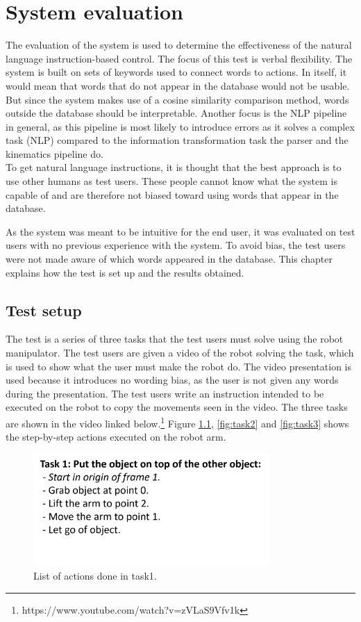 \chapter{System evaluation} \label{ch:eval}
The evaluation of the system is used to determine the effectiveness of the natural language instruction-based control. The focus of this test is verbal flexibility. The system is built on sets of keywords used to connect words to actions. In itself, it would mean that words that do not appear in the database would not be usable. But since the system makes use of a cosine similarity comparison method, words outside the database should be interpretable. Another focus is the NLP pipeline in general, as this pipeline is most likely to introduce errors as it solves a complex task (NLP) compared to the information transformation task the parser and the kinematics pipeline do.
\\
To get natural language instructions, it is thought that the best approach is to use other humans as test users.
These people cannot know what the system is capable of and are therefore not biased toward using words that appear in the database. 

As the system was meant to be intuitive for the end user, it was evaluated on test users with no previous experience with the system. To avoid bias, the test users were not made aware of which words appeared in the database.
This chapter explains how the test is set up and the results obtained.

\section{Test setup}
The test is a series of three tasks that the test users must solve using the robot manipulator. The test users are given a video of the robot solving the task, which is used to show what the user must make the robot do. The video presentation is used because it introduces no wording bias, as the user is not given any words during the presentation. The test users write an instruction intended to be executed on the robot to copy the movements seen in the video. The three tasks are shown in the video linked below.\footnote{https://www.youtube.com/watch?v=zVLaS9Vfv1k}
Figure \ref{fig:task1}, \ref{fig:task2} and \ref{fig:task3} shows the step-by-step actions executed on the robot arm.

\begin{figure}[ht]
    \centering
    \includegraphics[width=9cm]{img/Task1.png}
    \caption{List of actions done in task1.}
    \label{fig:task1}
\end{figure} 

